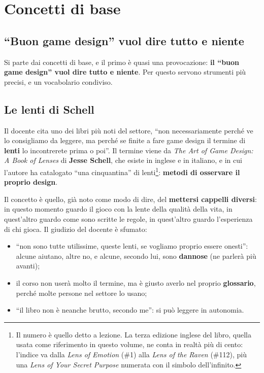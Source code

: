 \section{Concetti di base}
\label{a3:sec:base}

\subsection{``Buon game design'' vuol dire tutto e niente}

Si parte dai concetti di base, e il primo è quasi una provocazione: \textbf{il
``buon game design'' vuol dire tutto e niente}. Per questo servono strumenti più
precisi, e un vocabolario condiviso.

\subsection{Le lenti di Schell}



Il docente cita uno dei libri più noti del settore, ``non necessariamente perché
ve lo consigliamo da leggere, ma perché se finite a fare game design il termine
di \textbf{lenti} lo incontrerete prima o poi''. Il termine viene da \emph{The
Art of Game Design: A Book of Lenses} di \textbf{Jesse Schell}, che esiste in
inglese e in italiano, e in cui l'autore ha catalogato ``una cinquantina'' di
lenti\footnote{Il numero è quello detto a lezione. La terza edizione inglese del
libro, quella usata come riferimento in questo volume, ne conta in realtà più di
cento: l'indice va dalla \emph{Lens of Emotion} (\#1) alla \emph{Lens of the
Raven} (\#112), più una \emph{Lens of Your Secret Purpose} numerata con il
simbolo dell'infinito.}: \textbf{metodi di osservare il proprio design}.

Il concetto è quello, già noto come modo di dire, del \textbf{mettersi cappelli
diversi}: in questo momento guardo il gioco con la lente della qualità della
vita, in quest'altro guardo come sono scritte le regole, in quest'altro guardo
l'esperienza di chi gioca. Il giudizio del docente è sfumato:
\begin{itemize}
  \item ``non sono tutte utilissime, queste lenti, se vogliamo proprio essere
        onesti'': alcune aiutano, altre no, e alcune, secondo lui, sono
        \textbf{dannose} (ne parlerà più avanti);
  \item il corso non userà molto il termine, ma è giusto averlo nel proprio
        \textbf{glossario}, perché molte persone nel settore lo usano;
  \item ``il libro non è neanche brutto, secondo me'': si può leggere in
        autonomia.
\end{itemize}

